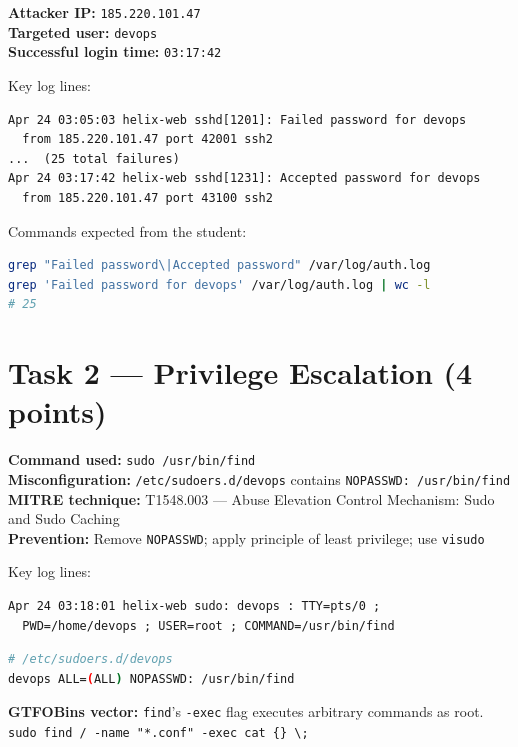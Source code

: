 \documentclass[a4paper, 12pt]{article}
\begin{document}
\textbf{Attacker IP:} \texttt{185.220.101.47}\\
\textbf{Targeted user:} \texttt{devops}\\
\textbf{Successful login time:} \texttt{03:17:42}

Key log lines:
\begin{lstlisting}
Apr 24 03:05:03 helix-web sshd[1201]: Failed password for devops
  from 185.220.101.47 port 42001 ssh2
...  (25 total failures)
Apr 24 03:17:42 helix-web sshd[1231]: Accepted password for devops
  from 185.220.101.47 port 43100 ssh2
\end{lstlisting}

Commands expected from the student:
\begin{lstlisting}[language=bash]
grep "Failed password\|Accepted password" /var/log/auth.log
grep 'Failed password for devops' /var/log/auth.log | wc -l
# 25
\end{lstlisting}

\section{Task 2 --- Privilege Escalation (4 points)}

\textbf{Command used:} \texttt{sudo /usr/bin/find}\\
\textbf{Misconfiguration:} \texttt{/etc/sudoers.d/devops} contains \texttt{NOPASSWD: /usr/bin/find}\\
\textbf{MITRE technique:} T1548.003 --- Abuse Elevation Control Mechanism: Sudo and Sudo Caching\\
\textbf{Prevention:} Remove \texttt{NOPASSWD}; apply principle of least privilege; use \texttt{visudo}

Key log lines:
\begin{lstlisting}
Apr 24 03:18:01 helix-web sudo: devops : TTY=pts/0 ;
  PWD=/home/devops ; USER=root ; COMMAND=/usr/bin/find
\end{lstlisting}

\begin{lstlisting}[language=bash]
# /etc/sudoers.d/devops
devops ALL=(ALL) NOPASSWD: /usr/bin/find
\end{lstlisting}

\begin{mdframed}[backgroundcolor=labgray, linewidth=0.5pt]
\textbf{GTFOBins vector:} \texttt{find}'s \texttt{-exec} flag executes arbitrary commands as root.\\
\texttt{sudo find / -name "*.conf" -exec cat \{\} \textbackslash;}
\end{mdframed}
\end{document}
